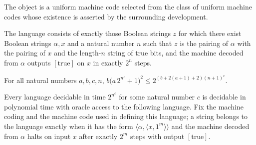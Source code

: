 \begin{definition}
\label{Complexity.expCode}
\leanok
{}
The object is a uniform machine code selected from the class of uniform machine codes
whose existence is asserted by the surrounding development.
\end{definition}

\begin{definition}
\label{Complexity.EXPCOM}
\leanok
{}
The language consists of exactly those Boolean strings $z$ for which there exist Boolean
strings $\alpha,x$ and a natural number $n$ such that $z$ is the pairing of $\alpha$
with the pairing of $x$ and the length-$n$ string of true bits, and the machine decoded
from $\alpha$ outputs $[\mathrm{true}]$ on $x$ in exactly $2^n$ steps.
\end{definition}

\begin{lemma}
\label{Complexity.expcom_padding_bound}
\leanok
{}
For all natural numbers $a,b,c,n$, $b\bigl(a\,2^{n^c}+1\bigr)^2\leq
2^{(b+2(a+1)+2)(n+1)^c}$.
\end{lemma}

\begin{theorem}
\label{Complexity.EXP_subset_POracle_EXPCOM}
\leanok
{}
Every language decidable in time $2^{n^c}$ for some natural number $c$ is decidable in
polynomial time with oracle access to the following language. Fix the machine coding and
the machine code used in defining this language; a string belongs to the language
exactly when it has the form $\langle\alpha,\langle x,1^m\rangle\rangle$ and the machine
decoded from $\alpha$ halts on input $x$ after exactly $2^m$ steps with output
$[\mathrm{true}]$.
\end{theorem}


